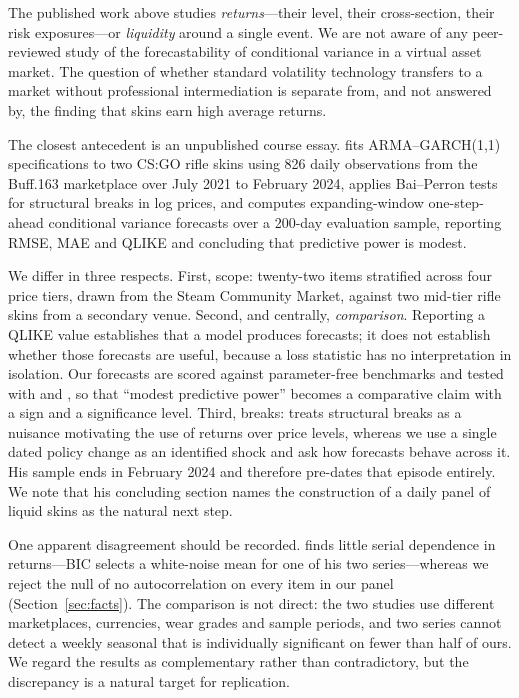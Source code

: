 \documentclass[11pt,a4paper]{article}
\begin{document}
The published work above studies \emph{returns}---their level, their
cross-section, their risk exposures---or \emph{liquidity} around a single
event. We are not aware of any peer-reviewed study of the forecastability of
conditional variance in a virtual asset market. The question of whether
standard volatility technology transfers to a market without professional
intermediation is separate from, and not answered by, the finding that skins
earn high average returns.

The closest antecedent is an unpublished course essay. \citet{Nikolaenko2025}
fits ARMA--GARCH(1,1) specifications to two CS:GO rifle skins using 826 daily
observations from the Buff.163 marketplace over July 2021 to February 2024,
applies Bai--Perron tests for structural breaks in log prices, and computes
expanding-window one-step-ahead conditional variance forecasts over a 200-day
evaluation sample, reporting RMSE, MAE and QLIKE and concluding that predictive
power is modest.

We differ in three respects. First, scope: twenty-two items stratified across
four price tiers, drawn from the Steam Community Market, against two mid-tier
rifle skins from a secondary venue. Second, and centrally, \emph{comparison}.
Reporting a QLIKE value establishes that a model produces forecasts; it does
not establish whether those forecasts are useful, because a loss statistic has
no interpretation in isolation. Our forecasts are scored against parameter-free
benchmarks and tested with \citet{DieboldMariano1995} and \citet{HLN2011}, so
that ``modest predictive power'' becomes a comparative claim with a sign and a
significance level. Third, breaks: \citet{Nikolaenko2025} treats structural
breaks as a nuisance motivating the use of returns over price levels, whereas
we use a single dated policy change as an identified shock and ask how
forecasts behave across it. His sample ends in February 2024 and therefore
pre-dates that episode entirely. We note that his concluding section names the
construction of a daily panel of liquid skins as the natural next step.

One apparent disagreement should be recorded. \citet{Nikolaenko2025} finds
little serial dependence in returns---BIC selects a white-noise mean for one of
his two series---whereas we reject the null of no autocorrelation on every item
in our panel (Section~\ref{sec:facts}). The comparison is not direct: the two
studies use different marketplaces, currencies, wear grades and sample periods,
and two series cannot detect a weekly seasonal that is individually significant
on fewer than half of ours. We regard the results as complementary rather than
contradictory, but the discrepancy is a natural target for replication.
\end{document}

